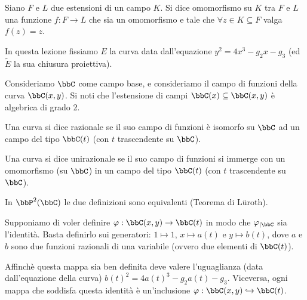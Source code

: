
\begin{definizione}
Siano $F$ e $L$ due estensioni di un campo $K$. Si dice omomorfismo su $K$ tra $F$ e $L$ una funzione $f:F\rightarrow L$ che sia un omomorfismo e tale che $\forall z\in K\subseteq F$ valga $f(z)=z$.
\end{definizione}
In questa lezione fissiamo $E$ la curva data dall'equazione $y^2=4x^3-g_2x-g_3$ (ed $\widetilde{E}$ la sua chiusura proiettiva).

Consideriamo $\bbC$ come campo base, e consideriamo il campo di funzioni della curva $\bbC(x,y)$. Si noti che l'estensione di campi $\bbC(x)\subseteq\bbC(x,y)$ è algebrica di grado 2.

\begin{definizione}
Una curva si dice razionale se il suo campo di funzioni è isomorfo su $\bbC$ ad un campo del tipo $\bbC(t)$ (con $t$ trascendente su $\bbC$).
\end{definizione}
\begin{definizione}
Una curva si dice unirazionale se il suo campo di funzioni si immerge con un omomorfismo (su $\bbC$) in un campo del tipo $\bbC(t)$ (con $t$ trascendente su $\bbC$).
\end{definizione}
\begin{osservazione}
In $\bbP^2(\bbC)$ le due definizioni sono equivalenti (Teorema di Lüroth).
\end{osservazione}
Supponiamo di voler definire $\varphi: \bbC(x,y) \rightarrow \bbC(t)$ in modo che $\varphi_{|\bbC}$ sia l'identità. Basta definirlo sui generatori: $1\mapsto 1$, $x\mapsto a(t)$ e $y\mapsto b(t)$, dove $a$ e $b$ sono due funzioni razionali di una variabile (ovvero due elementi di $\bbC(t)$).

Affinchè questa mappa sia ben definita deve valere l'uguaglianza (data dall'equazione della curva)   $b(t)^2=4a(t)^3-g_2a(t)-g_3$.
Viceversa, ogni mappa che soddisfa questa identità è un'inclusione $\varphi: \bbC(x,y) \hookrightarrow \bbC(t)$.

